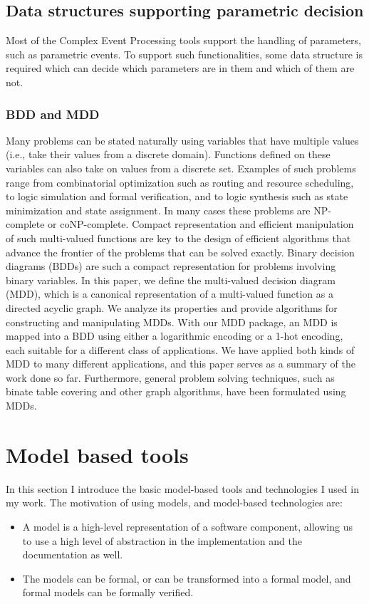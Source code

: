 \subsection{Data structures supporting parametric decision}
Most of the Complex Event Processing tools support the handling of parameters, such as parametric events.
To support such functionalities, some data structure is required which can decide which parameters are in them and which of them are not.

\subsubsection{BDD and MDD}

Many problems can be stated naturally using variables that have multiple values (i.e., take their values from a discrete domain). Functions defined on these variables can also take on values from a discrete set. Examples of such problems range from combinatorial optimization such as routing and resource scheduling, to logic simulation and formal verification, and to logic synthesis such as state minimization and state assignment. In many cases these problems are NP-complete or coNP-complete. Compact representation and efficient manipulation of such multi-valued functions are key to the design of efficient algorithms that advance the frontier of the problems that can be solved exactly. Binary decision diagrams (BDDs) are such a compact representation for problems involving binary variables. In this paper, we define the multi-valued decision diagram (MDD), which is a canonical representation of a multi-valued function as a directed acyclic graph. We analyze its properties and provide algorithms for constructing and manipulating MDDs. With our MDD package, an MDD is mapped into a BDD using either a logarithmic encoding or a 1-hot encoding, each suitable for a different class of applications. We have applied both kinds of MDD to many different applications, and this paper serves as a summary of the work done so far. Furthermore, general problem solving techniques, such as binate table covering and other graph algorithms, have been formulated using MDDs.\citep{Kam98mdd}

\section{Model based tools}
In this section I introduce the basic model-based tools and technologies I used in my work. The motivation of using models, and model-based technologies are:
\begin{itemize}
	\item A model is a high-level representation of a software component, allowing us to use a high level of abstraction in the implementation and the documentation as well.
	\item The models can be formal, or can be transformed into a formal model, and formal models can be formally verified.

\end{itemize}

